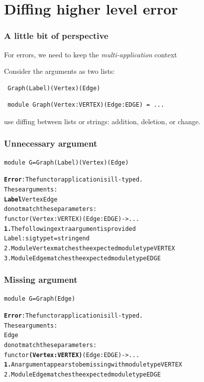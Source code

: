 \documentclass[11pt,aspectratio=169]{beamer}
\begin{document}
\section{Diffing higher level error}


\begin{frame}[fragile]\frametitle{A little bit of perspective}

  For errors, we need to keep the \emph{multi-application} context

Consider the arguments as two lists:
\begin{verbatim}
 Graph(Label)(Vertex)(Edge)
\end{verbatim}
\begin{verbatim}
 module Graph(Vertex:VERTEX)(Edge:EDGE) = ...
\end{verbatim}

use diffing between lists or strings: addition, deletion, or change.

\end{frame}

\begin{frame}[fragile]\frametitle{Unnecessary argument}
\begin{verbatim}
module G=Graph(Label)(Vertex)(Edge)
\end{verbatim}
\begin{alltt}
{\bfseries{}\color{red}{}Error}: The functor application is ill-typed.
       These arguments:
         {\color{red}{}\bfseries{}Label} {\color{green}{}Vertex} {\color{green}{}Edge}
       do not match these parameters:
         functor {\color{red}{}\bfseries{}} {\color{green}{}(Vertex : VERTEX)} {\color{green}{}(Edge : EDGE)} -> ...
  {\color{red}{}\bfseries{}1.} The following extra argument is provided
      Label : sig type t = string end
  {\color{green}{}2.} Module Vertex matches the expected module type VERTEX
  {\color{green}{}3.} Module Edge matches the expected module type EDGE
\end{alltt}
\end{frame}

\begin{frame}[fragile]\frametitle{Missing argument}
\begin{verbatim}
module G=Graph(Edge)
\end{verbatim}
\begin{alltt}
{\bfseries{}\color{red}{}Error}: The functor application is ill-typed.
       These arguments:
         {\color{red}{}\bfseries{}} {\color{green}{}Edge}
       do not match these parameters:
         functor {\color{red}{}\bfseries{}(Vertex : VERTEX)} {\color{green}{}(Edge : EDGE)} -> ...
  {\color{red}{}\bfseries{}1.} An argument appears to be missing with module type VERTEX
  {\color{green}{}2.} Module Edge matches the expected module type EDGE
\end{alltt}
\end{frame}
\end{document}

